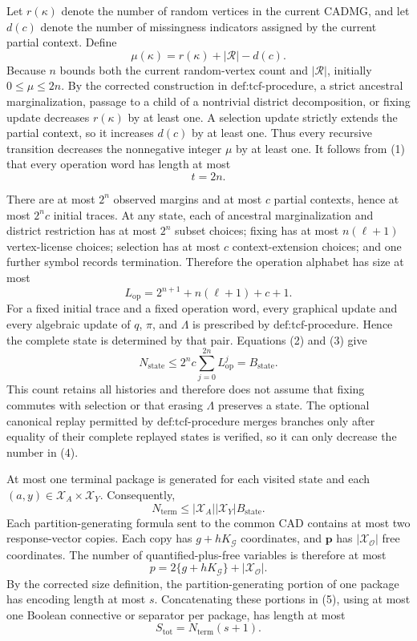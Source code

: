 Let \(r(\kappa)\) denote the number of random vertices in the current CADMG, and let \(d(c)\) denote the number of missingness indicators assigned by the current partial context. Define
\[
\mu(\kappa)=r(\kappa)+|\mathcal R|-d(c).
\tag{1}
\]
Because \(n\) bounds both the current random-vertex count and \(|\mathcal R|\), initially \(0\leq\mu\leq2n\). By the corrected construction in \(\text{def:tcf-procedure}\), a strict ancestral marginalization, passage to a child of a nontrivial district decomposition, or fixing update decreases \(r(\kappa)\) by at least one. A selection update strictly extends the partial context, so it increases \(d(c)\) by at least one. Thus every recursive transition decreases the nonnegative integer \(\mu\) by at least one. It follows from (1) that every operation word has length at most
\[
t=2n.
\tag{2}
\]

There are at most \(2^n\) observed margins and at most \(c\) partial contexts, hence at most \(2^n c\) initial traces. At any state, each of ancestral marginalization and district restriction has at most \(2^n\) subset choices; fixing has at most \(n(\ell+1)\) vertex-license choices; selection has at most \(c\) context-extension choices; and one further symbol records termination. Therefore the operation alphabet has size at most
\[
L_{\mathrm{op}}=2^{n+1}+n(\ell+1)+c+1.
\tag{3}
\]
For a fixed initial trace and a fixed operation word, every graphical update and every algebraic update of \(q\), \(\pi\), and \(\Lambda\) is prescribed by \(\text{def:tcf-procedure}\). Hence the complete state is determined by that pair. Equations (2) and (3) give
\[
N_{\mathrm{state}}
\leq 2^n c\sum_{j=0}^{2n}L_{\mathrm{op}}^j
=B_{\mathrm{state}}.
\tag{4}
\]
This count retains all histories and therefore does not assume that fixing commutes with selection or that erasing \(\Lambda\) preserves a state. The optional canonical replay permitted by \(\text{def:tcf-procedure}\) merges branches only after equality of their complete replayed states is verified, so it can only decrease the number in (4).

At most one terminal package is generated for each visited state and each \((a,y)\in\mathcal X_A\times\mathcal X_Y\). Consequently,
\[
N_{\mathrm{term}}
\leq |\mathcal X_A||\mathcal X_Y|B_{\mathrm{state}}.
\tag{5}
\]
Each partition-generating formula sent to the common CAD contains at most two response-vector copies. Each copy has \(g+hK_{\mathcal G}\) coordinates, and \(\mathbf p\) has \(|\mathcal X_{\mathcal O}|\) free coordinates. The number of quantified-plus-free variables is therefore at most
\[
p=2\{g+hK_{\mathcal G}\}+|\mathcal X_{\mathcal O}|.
\tag{6}
\]
By the corrected size definition, the partition-generating portion of one package has encoding length at most \(s\). Concatenating these portions in (5), using at most one Boolean connective or separator per package, has length at most
\[
S_{\mathrm{tot}}=N_{\mathrm{term}}(s+1).
\tag{7}
\]

